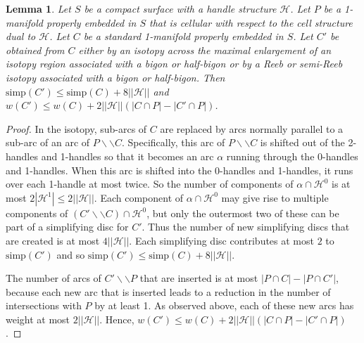 \documentclass[oneside]{amsart}
\numberwithin{equation}{section}
\theoremstyle{plain}
\newtheorem{lemma}[equation]{Lemma}
\theoremstyle{definition}
\newcommand{\cut}{\backslash\backslash}
\newcommand{\calH}{\mathcal{H}}
\begin{document}
\begin{lemma}
\label{Lem:IncreaseInSimp}
Let $S$ be a compact surface with a handle structure $\calH$. Let $P$ be a 1-manifold properly embedded in $S$ that is cellular with respect to the cell structure dual to $\calH$.
Let $C$ be a standard 1-manifold properly embedded in $S$. Let $C'$ be obtained from $C$ either by an isotopy across the maximal enlargement of an isotopy region associated with a bigon or half-bigon or by a Reeb or semi-Reeb isotopy associated with a bigon or half-bigon. Then $\mathrm{simp}(C') \leq \mathrm{simp}(C) + 8 ||\calH||$ and $w(C') \leq w(C) + 2 ||\calH||(|C \cap P| - |C' \cap P|)$.
\end{lemma}



\begin{proof}
In the isotopy, sub-arcs of $C$ are replaced by arcs normally parallel to a sub-arc of an arc of $P \cut C$. Specifically, this arc of $P \cut C$ is shifted out of the 2-handles and 1-handles so that it becomes an arc $\alpha$ running through the 0-handles and 1-handles. When this arc is shifted into the 0-handles and 1-handles, it runs over each 1-handle at most twice. So the number of components of $\alpha \cap \calH^0$ is at most $2|\calH^1| \leq 2||\calH||$. 
Each component of $\alpha \cap \calH^0$ may give rise to multiple components of $(C'\cut C) \cap \calH^0$, but only the outermost two of these can be part of a simplifying disc for $C'$. Thus the number of new simplifying discs that are created is at most $4 ||\calH||$. Each simplifying disc contributes at most $2$ to $\mathrm{simp}(C')$ and so $\mathrm{simp}(C') \leq \mathrm{simp}(C) + 8 ||\calH||$.

The number of arcs of $C' \cut P$ that are inserted is at most $|P \cap C| - |P \cap C'|$, because each new arc that is inserted leads to a reduction in the number of intersections with $P$ by at least 1. As observed above, each of these new arcs has weight at most $2||\calH||$. Hence, $w(C') \leq w(C) + 2 ||\calH||(|C \cap P| - |C' \cap P|)$.
\end{proof}
\end{document}
